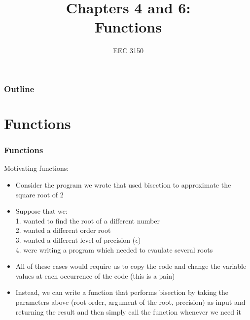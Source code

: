 \documentclass{beamer}
\title{Chapters 4 and 6: \\ Functions}
\author{EEC 3150}
\date{}
\institute{Trevecca Nazarene University}
\begin{document}
\frame{\titlepage}
 
\begin{frame}	
	\frametitle{Outline}
	\tableofcontents	
\end{frame}


\section{Functions}

\begin{frame}	
\end{frame}

\begin{frame}	
	\frametitle{Functions}
	
	\begin{block}{Motivating functions:}
		\begin{itemize}
			\item Consider the program we wrote that used bisection to approximate the square root of 2
			\item Suppose that we:\\
					1. wanted to find the root of a different number \\
					2. wanted a different order root \\
					3. wanted a different level of precision ($\epsilon$) \\
					4. were writing a program which needed to evaulate several roots
			\item All of these cases would require us to copy the code and change the variable values at each occurrence of the code (this is a pain)
			\item Instead, we can write a function that performs bisection by taking the parameters above (root order, argument of the root, precision) as input and returning the result and then simply call the function whenever we need it
		\end{itemize}
	\end{block}
	
\end{frame}
\end{document}
